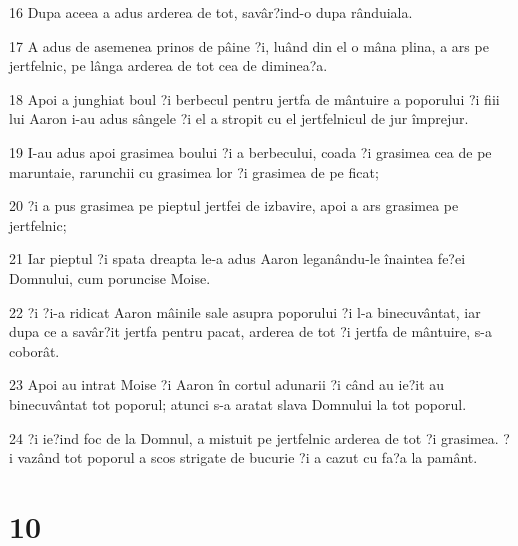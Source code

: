 \par 16 Dupa aceea a adus arderea de tot, savâr?ind-o dupa rânduiala.
\par 17 A adus de asemenea prinos de pâine ?i, luând din el o mâna plina, a ars pe jertfelnic, pe lânga arderea de tot cea de diminea?a.
\par 18 Apoi a junghiat boul ?i berbecul pentru jertfa de mântuire a poporului ?i fiii lui Aaron i-au adus sângele ?i el a stropit cu el jertfelnicul de jur împrejur.
\par 19 I-au adus apoi grasimea boului ?i a berbecului, coada ?i grasimea cea de pe maruntaie, rarunchii cu grasimea lor ?i grasimea de pe ficat;
\par 20 ?i a pus grasimea pe pieptul jertfei de izbavire, apoi a ars grasimea pe jertfelnic;
\par 21 Iar pieptul ?i spata dreapta le-a adus Aaron leganându-le înaintea fe?ei Domnului, cum poruncise Moise.
\par 22 ?i ?i-a ridicat Aaron mâinile sale asupra poporului ?i l-a binecuvântat, iar dupa ce a savâr?it jertfa pentru pacat, arderea de tot ?i jertfa de mântuire, s-a coborât.
\par 23 Apoi au intrat Moise ?i Aaron în cortul adunarii ?i când au ie?it au binecuvântat tot poporul; atunci s-a aratat slava Domnului la tot poporul.
\par 24 ?i ie?ind foc de la Domnul, a mistuit pe jertfelnic arderea de tot ?i grasimea. ?i vazând tot poporul a scos strigate de bucurie ?i a cazut cu fa?a la pamânt.

\chapter{10}

